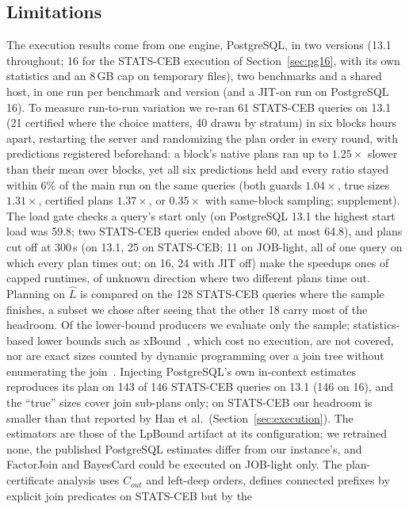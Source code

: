 \documentclass[sigconf, nonacm]{acmart}
\begin{document}
\subsection{Limitations}
\label{sec:limitations}
The execution results come from one engine, PostgreSQL, in two versions (13.1
throughout; 16 for the STATS-CEB execution of Section~\ref{sec:pg16}, with its
own statistics and an 8\,GB cap on temporary files), two benchmarks and a shared
host, in one run per benchmark and version (and a JIT-on run on PostgreSQL 16).
To measure run-to-run variation we re-ran 61 STATS-CEB queries on 13.1 (21 certified
where the choice matters, 40 drawn by stratum) in six blocks hours
apart, restarting the server and randomizing the plan order in every round,
with predictions registered beforehand: a block's native plans ran up to
$1.25\times$ slower than their mean over blocks, yet all six predictions held
and every ratio stayed within 6\% of the main run on the same queries (both guards $1.04\times$, true
sizes $1.31\times$, certified plans $1.37\times$, or $0.35\times$ with same-block
sampling; supplement). The load gate checks a query's start only (on PostgreSQL 13.1 the
highest start load was 59.8; two STATS-CEB queries ended above 60, at most
64.8), and plans cut off at
300\,s (on 13.1, 25 on STATS-CEB; 11 on JOB-light, all of one query on which
every plan times out; on 16, 24 with JIT off) make the speedups ones of capped
runtimes, of unknown direction where two different plans time out. Planning on $\hat L$ is compared on the 128 STATS-CEB
queries where the sample finishes, a subset we chose after seeing that the
other 18 carry most of the headroom. Of the lower-bound producers we evaluate
only the sample; statistics-based lower bounds such as
xBound~\cite{stoian2026xbound}, which cost no execution, are not covered, nor are
exact sizes counted by dynamic programming over a join tree without
enumerating the join~\cite{zhao2018sampling}.
Injecting PostgreSQL's own in-context estimates reproduces its plan on 143 of
146 STATS-CEB queries on 13.1 (146 on 16), and the ``true'' sizes cover join sub-plans only; on STATS-CEB our headroom
is smaller than that reported by Han et al.\ (Section~\ref{sec:execution}). The
estimators are those of the LpBound artifact at its configuration; we
retrained none, the published PostgreSQL estimates differ from our instance's,
and FactorJoin and BayesCard could be executed on JOB-light only. The
plan-certificate analysis uses $C_{out}$ and left-deep orders, defines
connected prefixes by explicit join predicates on STATS-CEB but by the
\end{document}
